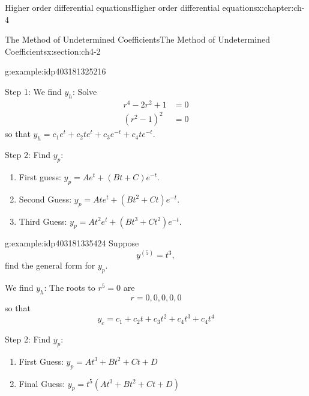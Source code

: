 \documentclass[oneside,10pt,]{book}
\numberwithin{equation}{section}
\numberwithin{equation}{section}
\newcommand{\amp}{&}
\begin{document}
\begin{chapterptx}{Higher order differential equations}{}{Higher order differential equations}{}{}{x:chapter:ch-4}
\begin{sectionptx}{The Method of Undetermined Coefficients}{}{The Method of Undetermined Coefficients}{}{}{x:section:ch4-2}
\begin{example}{}{g:example:idp403181325216}
\par
Step 1: We find \(y_{h}\): Solve%
\begin{align*}
r^{4}-2r^{2}+1 \amp =0\\
\left(r^{2}-1\right)^{2} \amp =0
\end{align*}
so that \(y_{h}=c_{1}e^{t}+c_{2}te^{t}+c_{3}e^{-t}+c_{4}te^{-t}\).%
\par
Step 2: Find \(y_{p}\):%
\begin{enumerate}
\item{}First guess: \(y_{p}=Ae^{t}+\left(Bt+C\right)e^{-t}\).%
\item{}Second Guess: \(y_{p}=Ate^{t}+\left(Bt^{2}+Ct\right)e^{-t}\).%
\item{}Third Guess: \(y_{p}=At^{2}e^{t}+\left(Bt^{3}+Ct^{2}\right)e^{-t}\).%
\end{enumerate}
%
\end{example}
\begin{example}{}{g:example:idp403181335424}%
Suppose%
\begin{equation*}
y^{(5)}=t^{3},
\end{equation*}
find the general form for \(y_{p}\).%
\par
We find \(y_{h}\): The roots to \(r^{5}=0\) are%
\begin{equation*}
r=0,0,0,0,0
\end{equation*}
so that%
\begin{equation*}
y_{c} =c_{1}+c_{2}t+c_{3}t^{2}+c_{4}t^{3}+c_{4}t^{4}
\end{equation*}
%
\par
Step 2: Find \(y_{p}\):%
\begin{enumerate}
\item{}First Guess: \(y_{p}=At^{3}+Bt^{2}+Ct+D\)%
\item{}Final Guess:\textbraceright{}\textbraceright{} \(y_{p}=t^{5}\left(At^{3}+Bt^{2}+Ct+D\right)\)%
\end{enumerate}
%
\end{example}
\end{sectionptx}
\end{chapterptx}
%
%
\typeout{************************************************}
\typeout{************************************************}
%
\end{document}
